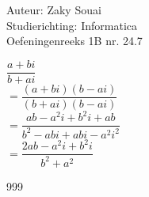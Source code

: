 \documentclass[a4paper]{article}
\begin{document}
  
\noindent \large Auteur: Zaky Souai \\
\noindent \large Studierichting: Informatica\\
\noindent \large Oefeningenreeks 1B nr. 24.7\\

\medskip

\normalsize

$ \dfrac{a + bi}{b + ai} $\\

$= \dfrac{(a + bi)(b - ai)}{(b + ai)(b - ai)} $\\

$= \dfrac{ab - a^2i + b^2i + ab}{b^2 - abi + abi - a^2i^2} $\\

$= \dfrac{2ab - a^2i + b^2i}{b^2 + a^2} $

\begin{thebibliography}{999}
\end{thebibliography}
\end{document}
